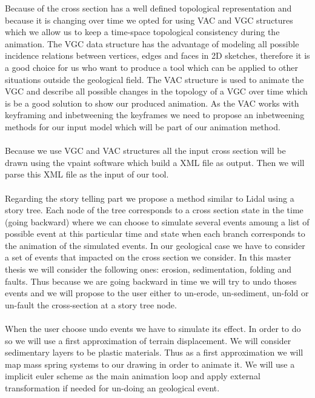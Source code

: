 \documentclass[12pt, a4paper]{memoir} %
\begin{document}
Because of the cross section has a well defined topological representation and because it is changing over time we opted for using VAC and VGC structures which we allow us to keep a time-space topological consistency during the animation. The VGC data structure has the advantage of modeling all possible incidence relations between vertices, edges and faces in 2D sketches, therefore it is a good choice for us who want to produce a tool which can be applied to other situations outside the geological field. The VAC structure is used to animate the VGC and describe all possible changes in the topology of a VGC over time which is be a good solution to show our produced animation. As the VAC works with keyframing and inbetweening the keyframes we need to propose an inbetweening methods for our input model which will be part of our animation method.\\\\
  Because we use VGC and VAC structures all the input cross section will be drawn using the vpaint software \cite{vpaint} which build a XML file as output. Then we will parse this XML file as the input of our tool.\\\\
Regarding the story telling part we propose a method similar to Lidal \cite{lidal} using a story tree. Each node of the tree corresponds to a cross section state in the time (going backward) where we can choose to simulate several events amoung a list of possible event at this particular time and state when each branch corresponds to the animation of the simulated events.
In our geological case we have to consider a set of events that impacted on the cross section we consider. In this master thesis we will consider the following ones: erosion, sedimentation, folding and faults. Thus because we are going backward in time we will try to undo thoses events and we will propose to the user either to un-erode, un-sediment, un-fold or un-fault the cross-section at a story tree node. \\\\
When the user choose undo events we have to simulate its effect. In order to do so we will use a first approximation of terrain displacement. We will consider sedimentary layers to be plastic materials. Thus as a first approximation we will map mass spring systems to our drawing in order to animate it. We will use a implicit euler scheme as the main animation loop and apply external transformation if needed for un-doing an geological event.\\\\
\end{document}
